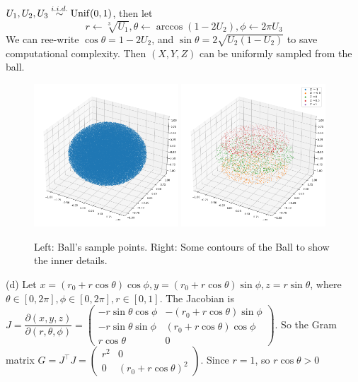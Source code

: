 \begin{homeworkProblem}
$U_1, U_2, U_3\stackrel{i.i.d.}{\sim} \operatorname{Unif}(0, 1)$, then let
$$r\leftarrow \sqrt[3]{U_1}, \theta\leftarrow \arccos(1-2U_2), \phi\leftarrow 2\pi U_3$$
We can ree-write $\cos\theta=1-2U_2$, and $\sin\theta=2\sqrt{U_2(1-U_2)}$ to save computational complexity.
Then $(X, Y, Z)$ can be uniformly sampled from the ball.

\begin{figure}[ht]
    \centering
    \includegraphics[width=0.48\textwidth]{./figure/p7/c_sample.png}
    \includegraphics[width=0.48\textwidth]{./figure/p7/c_contour.png}
    \caption{Left: Ball's sample points. Right: Some contours of the Ball to show the inner details.}
\end{figure}


(d) Let $x=(r_0+r\cos\theta)\cos\phi, y=(r_0+r\cos\theta)\sin\phi, z=r\sin\theta$, where $\theta\in [0, 2\pi], \phi\in [0, 2\pi], r\in [0, 1]$. The Jacobian is $J=\dfrac{\partial(x, y, z)}{\partial(r, \theta, \phi)}=\begin{pmatrix}
-r\sin\theta\cos\phi & -(r_0+r\cos\theta)\sin\phi \\
-r\sin\theta\sin\phi & (r_0+r\cos\theta)\cos\phi \\
r\cos\theta & 0
\end{pmatrix}$.
So the Gram matrix $G=J^{\top}J=\begin{pmatrix}
r^2 & 0 \\
0 & (r_0+r\cos\theta)^2
\end{pmatrix}$.
Since $r=1$, so $r\cos\theta>0$


\end{homeworkProblem}
